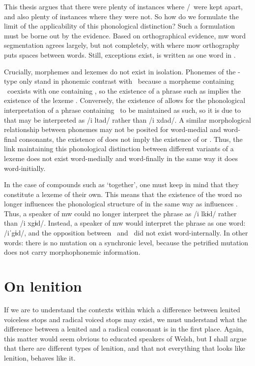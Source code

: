 This thesis argues that there were plenty of instances where \lT/\xD\ were kept apart, and also plenty of instances where they were not. 
So how do we formulate the limit of the applicability of this phonological distinction?
Such a formulation must be borne out by the evidence. Based on orthographical evidence, \gls{mw} word segmentation agrees largely, but not completely, with where \gls{mow} orthography puts spaces between words.
Still, exceptions exist, \eg {} is written as  one word in .

Crucially, morphemes and lexemes do not exist in isolation. 
Phonemes of the \lT -type only stand in phonemic contrast with \xD\ because a morpheme containing \lT\ coexists with one containing \xT, so the existence of a phrase such as  implies the existence of the lexeme .
Conversely, the existence of  allows for the phonological interpretation of a phrase containing \lT\ to be maintained as such, so it is due to  that  may be interpreted as /i \gls{l}tad/ rather than /i \gls{x}dad/.
A similar morphological relationship between phonemes may not be posited for word-medial and word-final consonants, \eg the existence of  does not imply the existence of  or .
Thus, the link maintaining this phonological distinction between different variants of a lexeme does not exist word-medially and word-finally in the same way it does word-initially.

In the case of compounds such as  `together', one must keep in mind that they constitute a lexeme of their own. This means that the existence of the word  no longer influences the phonological structure of  in the same way as  influences .  Thus, a speaker of \gls{mw} could no longer  interpret the phrase  as /i \gls{l}kɨd/ rather than /i \gls{x}gɨd/. Instead, a speaker of \gls{mw} would interpret the phrase as one word: /iˈgɨd/, and the opposition between \lT\ and \xD\ did not exist word-internally. In other words: there is no mutation on a synchronic level, because the petrified mutation does not carry morphophonemic information.

\section{On lenition}
\label{sec:lenition}
If we are to understand the contexts within which a difference between lenited voiceless stops and radical voiced stops may exist,
we must understand what the difference between a lenited and a radical consonant is in the first place. 
Again, this matter would seem obvious to educated speakers of Welsh, 
but I shall argue that there are different types of lenition, 
and that not everything that looks like lenition, behaves like it.


